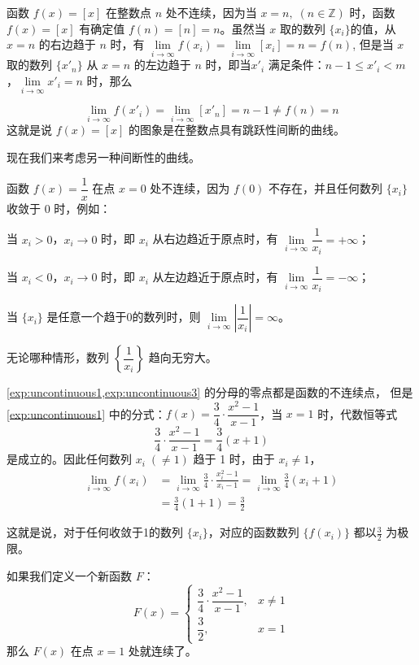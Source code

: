 \begin{example}\label{exp:uncontinuous2}
{\linespread{1.6}\selectfont 函数 $f(x)=[x]$ 在整数点 $n$ 处不连续，因为当 $x=n,\; (n\in\mathbb{Z})$ 时，函数 $f(x)=[x]$ 有确定值 $f(n)=[n]=n$。虽然当 $x$ 取的数列 $\{x_i\}$的值，从$x=n$ 的右边趋于 $n$ 时，有 $\lim\limits_{i\to\infty}f(x_i)=\lim\limits_{i\to\infty}[x_i]=n=f(n)$, 但是当 $x$ 取的数列 $\{x'_n\}$ 从 $x=n$ 的左边趋于 $n$ 时，即当$x'_i$ 满足条件：$n-1\leqslant x'_i <m$，$\lim\limits_{i\to \infty}x'_i=n$ 时，那么\par}
  \[\lim_{i\to \infty}f(x'_i)=\lim_{i\to \infty}[x'_n]=n-1\ne f(n)=n\]
这就是说 $f(x)=[x]$ 的图象是在整数点具有跳跃性间断的曲线。
\end{example}

现在我们来考虑另一种间断性的曲线。
\begin{example}\label{exp:uncontinuous3}
函数 $f(x)=\dfrac{1}{x}$ 在点 $x=0$ 处不连续，因为 $f(0)$ 不存在，并且任何数列 $\{x_i\}$ 收敛于 0 时，例如：

当 $x_i>0$，$x_i\to 0$ 时，即 $x_i$ 从右边趋近于原点时，有 $\lim\limits_{i\to\infty}\dfrac{1}{x_i}=+\infty$；

当 $x_i<0$，$x_i\to 0$ 时，即 $x_i$ 从左边趋近于原点时，有 $\lim\limits_{i\to\infty}\dfrac{1}{x_i}=-\infty$；

当 $\{x_i\}$ 是任意一个趋于0的数列时，则 $\lim\limits_{i\to\infty}\left|\dfrac{1}{x_i}\right|=\infty$。

无论哪种情形，数列 $\left\{\dfrac{1}{x_i}\right\}$ 趋向无穷大。
\end{example}

\begin{rmk}
\cref{exp:uncontinuous1,exp:uncontinuous3} 的分母的零点都是函数的不连续点，
但是\cref{exp:uncontinuous1} 中的分式：$f(x)=\dfrac{3}{4}\cdot\dfrac{x^2-1}{x-1}$，当 $x=1$ 时，代数恒等式
\[\frac{3}{4}\cdot\frac{x^2-1}{x-1}=\frac{3}{4}(x+1)\]
是成立的。因此任何数列 $x_i\; (\ne 1)$ 趋于 1 时，由于 $x_i\ne 1$，
\[\begin{split}
  \lim_{i\to\infty}f(x_i)&=\lim_{i\to\infty}\frac{3}{4}\cdot \frac{x^2_i-1}{x_i-1}=\lim_{i\to\infty}\frac{3}{4}(x_i+1)\\
  &=\frac{3}{4}(1+1)=\frac{3}{2}
\end{split}\]

这就是说，对于任何收敛于1的数列 $\{x_i\}$，对应的函数数列 $\{f(x_i)\}$ 都以$\frac{3}{2}$ 为极限。 

如果我们定义一个新函数 $F$：
\[F(x)=\begin{cases}
    \dfrac{3}{4}\cdot\dfrac{x^2-1}{x-1},& x\ne 1\\
    \dfrac{3}{2}, & x=1
\end{cases}\]
那么 $F(x)$ 在点 $x=1$ 处就连续了。
\end{rmk}

